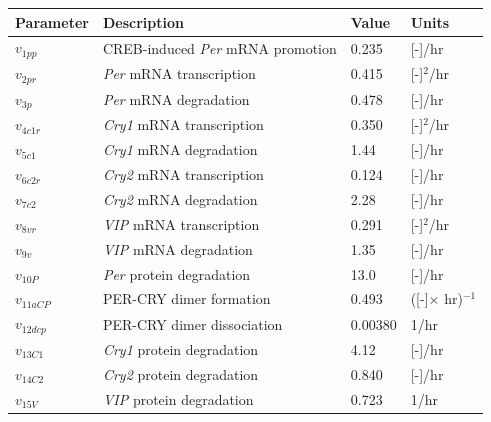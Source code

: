 \begin{table}[p]
\begin{center}
\end{center}
\end{table}


\begin{table}[p]
    \begin{center}
\begin{tabular}{l l l l}\hline
	Parameter & Description & Value & Units\\
	\hline
	$v_{1pp}$ & CREB-induced \textit{Per} mRNA promotion & 0.235 & [-]/hr
	\\
	$v_{2pr}$ & \textit{Per} mRNA transcription & 0.415 & [-]$^2$/hr
	\\
	$v_{3p}$ & \textit{Per} mRNA degradation & 0.478 & [-]/hr
	\\
	$v_{4c1r}$ & \textit{Cry1} mRNA transcription & 0.350 & [-]$^2$/hr
	\\
	$v_{5c1}$ & \textit{Cry1} mRNA degradation & 1.44 & [-]/hr
	\\
	$v_{6c2r}$ & \textit{Cry2} mRNA transcription & 0.124 & [-]/hr
	\\
	$v_{7c2}$ & \textit{Cry2} mRNA degradation & 2.28 & [-]/hr
	\\
	$v_{8vr}$ & \textit{VIP} mRNA transcription & 0.291 & [-]$^2$/hr
	\\
	$v_{9v}$ & \textit{VIP} mRNA degradation & 1.35 & [-]/hr
	\\
	$v_{10P}$ & \textit{Per} protein degradation & 13.0 & [-]/hr
	\\
	$v_{11aCP}$ & PER-CRY dimer formation & 0.493 & ([-]$\times$ hr)$^{-1}$
	\\
	$v_{12dcp}$ & PER-CRY dimer dissociation & 0.00380 & 1/hr
	\\
	$v_{13C1}$ & \textit{Cry1} protein degradation & 4.12 & [-]/hr
	\\
	$v_{14C2}$ & \textit{Cry2} protein degradation & 0.840 & [-]/hr
	\\
	$v_{15V}$ & \textit{VIP} protein degradation & 0.723 & 1/hr

\end{tabular}
\end{center}
\end{table}
